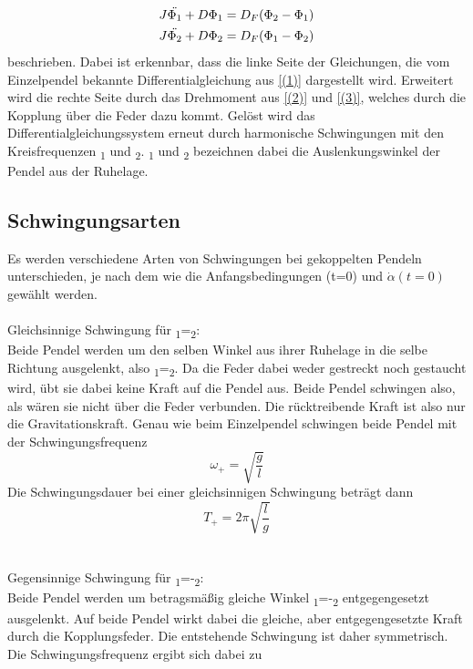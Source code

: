 \documentclass[titlepage=firstcover, captions=tableheading]{scrartcl}
\begin{document}
\begin{align}
    J\ddot{\Phi_1}+D\Phi_1=D_F(\Phi_2-\Phi_1) \notag\\
    J\ddot{\Phi_2}+D\Phi_2=D_F(\Phi_1-\Phi_2) \notag
\end{align} 
beschrieben. Dabei ist erkennbar, dass die linke Seite der Gleichungen, die vom Einzelpendel bekannte Differentialgleichung aus \ref*{(1)} dargestellt wird. Erweitert wird die rechte Seite durch das Drehmoment aus \ref*{(2)} und \ref*{(3)}, welches durch die Kopplung über die Feder dazu kommt. Gelöst wird das Differentialgleichungssystem erneut durch harmonische Schwingungen mit den Kreisfrequenzen \omega\textsubscript{1} und \omega\textsubscript{2}. \alpha\textsubscript{1} und \alpha\textsubscript{2} bezeichnen dabei die Auslenkungswinkel der Pendel aus der Ruhelage.
\newpage
\subsection{Schwingungsarten}
Es werden verschiedene Arten von Schwingungen bei gekoppelten Pendeln unterschieden, je nach dem wie die Anfangsbedingungen \alpha(t=0) und $\dot{\alpha}(t=0)$ gewählt werden.\\\\
\noindent Gleichsinnige Schwingung für \alpha\textsubscript{1}=\alpha\textsubscript{2}:\\
Beide Pendel werden um den selben Winkel \alpha aus ihrer Ruhelage in die selbe Richtung ausgelenkt, also \alpha\textsubscript{1}=\alpha\textsubscript{2}. Da die Feder dabei weder gestreckt noch gestaucht wird, übt sie dabei keine Kraft auf die Pendel aus. Beide Pendel schwingen also, als wären sie nicht über die Feder verbunden. Die rücktreibende Kraft ist also nur die Gravitationskraft. Genau wie beim Einzelpendel schwingen beide Pendel mit der Schwingungsfrequenz
\begin{displaymath}
    \omega_+=\sqrt{\frac{g}{l}}
\end{displaymath}
Die Schwingungsdauer bei einer gleichsinnigen Schwingung beträgt dann 
\begin{equation}\label{T+}
    T_+ =2\pi\sqrt{\frac{l}{g}}
\end{equation}
\\\\
\noindent Gegensinnige Schwingung für \alpha\textsubscript{1}=-\alpha\textsubscript{2}:\\
Beide Pendel werden um betragsmäßig gleiche Winkel \alpha\textsubscript{1}=-\alpha\textsubscript{2} entgegengesetzt ausgelenkt. Auf beide Pendel wirkt dabei die gleiche, aber entgegengesetzte Kraft durch die Kopplungsfeder. Die entstehende Schwingung ist daher symmetrisch. Die Schwingungsfrequenz ergibt sich dabei zu 
\end{document}
